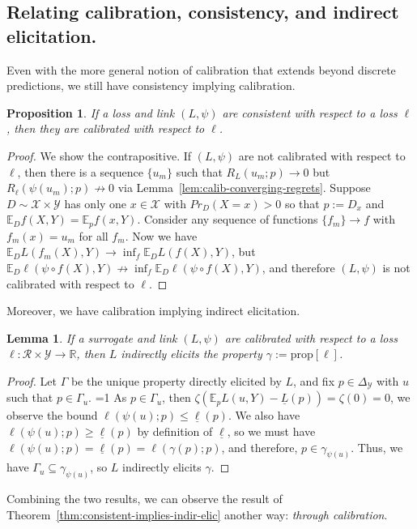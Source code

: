 \documentclass{article}
\newcommand{\Comments}{1}
\newcommand{\mytodo}[2]{\ifnum\Comments=1%
	\todo[linecolor=#1!80!black,backgroundcolor=#1,bordercolor=#1!80!black]{#2}\fi}
\newcommand{\raft}[1]{\mytodo{green!20!white}{RF: #1}}
\newcommand{\reals}{\mathbb{R}}
\newcommand{\simplex}{\Delta_\Y}
\newcommand{\prop}[1]{\mathrm{prop}[#1]}
\newcommand{\E}{\mathbb{E}}
\newcommand{\R}{\mathcal{R}}
\newcommand{\X}{\mathcal{X}}
\newcommand{\Y}{\mathcal{Y}}
\newcommand{\exploss}[3]{\E_{#3} #1(#2,Y)}
\newcommand{\risk}[1]{\underline{#1}}
\newtheorem{lemma}{Lemma}
\newtheorem{proposition}{Proposition}
\begin{document}
\subsection{Relating calibration, consistency, and indirect elicitation.}
Even with the more general notion of calibration that extends beyond discrete predictions, we still have consistency implying calibration.
\begin{proposition}\label{prop:consistent-implies-calibrated}
	If a loss and link $(L, \psi)$ are consistent with respect to a loss $\ell$, then they are calibrated with respect to $\ell$.
\end{proposition}
\begin{proof}
	We show the contrapositive.
	If $(L, \psi)$ are not calibrated with respect to $\ell$, then there is a sequence $\{u_m\}$ such that $R_L(u_m; p) \to 0$ but $R_\ell(\psi(u_m); p) \not \to 0$ via Lemma~\ref{lem:calib-converging-regrets}.
	Suppose $D \sim \X \times\Y$ has only one $x \in \X$ with $Pr_D(X = x) > 0$ so that $p := D_x$ and $\E_D f(X,Y) = \E_p f(x, Y)$.
	Consider any sequence of functions $\{f_m\} \to f$ with $f_m(x) = u_m$ for all $f_m$.
	Now we have $\E_D L(f_m(X), Y) \to \inf_f \E_D L(f(X), Y)$, but $\E_D \ell(\psi \circ f(X), Y) \not \to \inf_f \E_D \ell(\psi \circ f(X), Y)$, and therefore $(L, \psi)$ is not calibrated with respect to $\ell$.
\end{proof}

Moreover, we have calibration implying indirect elicitation.
\begin{lemma}\label{lem:calib-implies-indir}
	If a surrogate and link $(L, \psi)$ are calibrated with respect to a loss $\ell:\R \times\Y \to \reals$, then $L$ indirectly elicits the property $\gamma := \prop{\ell}$.
\end{lemma}
\begin{proof}
	Let $\Gamma$ be the unique property directly elicited by $L$, and fix $p \in \simplex$ with $u$ such that $p \in \Gamma_u$.
  \raft{Use $\Gamma(p) \neq \emptyset$ here!}
	As $p \in \Gamma_u$, then $\zeta(\exploss{L}{u}{p} - \risk{L}(p)) = \zeta(0) = 0$, we observe the bound $\ell(\psi(u); p) \leq \risk{\ell}(p)$.
	We also have $\ell(\psi(u); p) \geq \risk{\ell}(p)$ by definition of $\risk{\ell}$, so we must have $\ell(\psi(u);p) = \risk{\ell}(p) = \ell(\gamma(p); p)$, and therefore, $p \in \gamma_{\psi(u)}$.
	Thus, we have $\Gamma_u \subseteq \gamma_{\psi(u)}$, so $L$ indirectly elicits $\gamma$.
\end{proof}

Combining the two results, we can observe the result of Theorem~\ref{thm:consistent-implies-indir-elic} another way: \emph{through calibration}.
\end{document}
